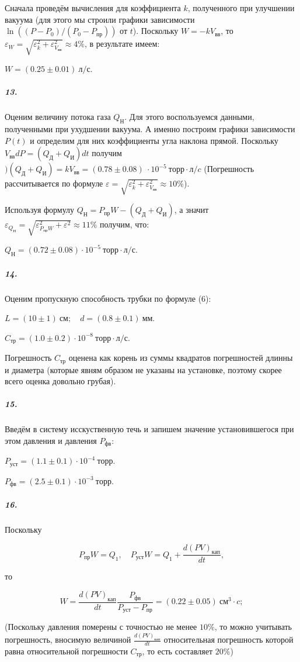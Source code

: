 \documentclass[a4paper,12pt]{article}
\begin{document}
\newpage

Сначала проведём вычисления для коэффициента $k$, полученного при улучшении вакуума (для этого мы строили графики зависимости $\ln ((P-P_0) / (P_0 - P_{пр}))$ от $t$). Поскольку $W = -kV_{вв}$, то $\varepsilon_W = \sqrt{\varepsilon_k^2 + \varepsilon_{V_{вв}}^2} \approx 4\%$, в результате имеем: 

$
W = (0.25 \pm 0.01) ~ л /с.
$


\subparagraph*{13.} Оценим величину потока газа  $Q_Н$. Для этого воспользуемся данными, полученными при ухудшении вакуума. А именно построим графики зависимости $P(t)$ и определим для них коэффициенты угла наклона прямой. Поскольку $V_{вв}dP = (Q_Д + Q_И) dt$ получим $)(Q_Д + Q_И) = kV_{вв} = (0.78 \pm 0.08)~ \cdot 10^{-5} ~торр \cdot л / c $ (Погрешность рассчитывается по формуле $\varepsilon =  \sqrt{\varepsilon_k^2 + \varepsilon_{V_{вв}}^2} \approx 10\%$). 


 Используя формулу $Q_Н = P_{пр}W - (Q_Д + Q_И)$, а значит $\varepsilon_{Q_Н} =  \sqrt{\varepsilon_{P_{пр}W}^2 + \varepsilon^2} \approx 11\%$ получим, что: 
 
 $
 Q_Н = (0.72 \pm 0.08) \cdot 10^{-5} ~ торр \cdot л / с.
 $
 
 

\subparagraph*{14.} Оценим пропускную способность трубки по формуле (6):

$
L = (10 \pm 1)~ см; \quad   d = (0.8 \pm 0.1) ~ мм.
$ 

$
C_{тр} = (1.0 \pm 0.2)\cdot 10^{-8} ~ торр \cdot л / с.
$
 
Погрешность $C_{тр}$  оценена как корень из суммы квадратов погрешностей длинны и диаметра (которые явням образом не указаны на установке, поэтому скорее всего оценка довольно грубая). 

\subparagraph*{15.} Введём в систему исскуственную течь и запишем значение  установившегося при этом давления и давления $P_{фв}$: 


$
P_{уст} = (1.1 \pm 0.1) \cdot 10^{-4} ~ торр.
$

$
P_{фв} = (2.5 \pm 0.1) \cdot 10^{-3} ~ торр.
$


\subparagraph*{16.} Поскольку

$$
P_{пр} W = Q_1, \quad P_{уст} W = Q_1 + \frac{d(PV)_{кап}}{dt}, 
$$

то 

$$
W = \frac{d(PV)_{кап}}{dt}\frac{P_{фв}}{P_{ уст}-P_{пр}} = (0.22 \pm 0.05) ~см^3 \cdot c;
$$


(Поскольку давления померены с точностью не менее $10\%$, то можно учитывать погрешность, вносимую величиной $\frac{d(PV)_{кап}}{dt}$ относительная погрешность которой равна относительной погрешности $C_{тр}$, то есть составляет $20\%$)
\end{document}
